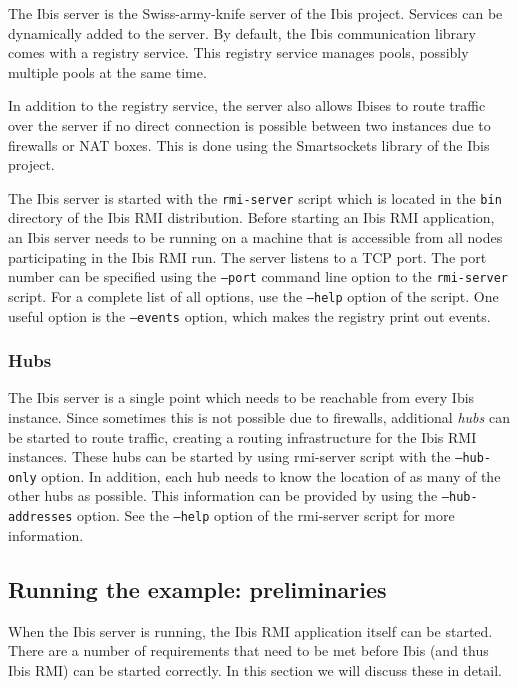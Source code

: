 \documentclass[a4paper,10pt]{article}
\begin{document}
The Ibis server is the Swiss-army-knife server of the Ibis project.
Services can be dynamically added to the server. By default, the Ibis
communication library comes with a registry service. This registry
service manages pools, possibly multiple pools at the same time.

In addition to the registry service, the server also allows
Ibises to route traffic over the server if no direct connection is
possible between two instances due to firewalls or NAT boxes. This is
done using the Smartsockets library of the Ibis project.

The Ibis server is started with the \texttt{rmi-server} script which is
located in the \texttt{bin} directory of the Ibis RMI distribution.  Before
starting an Ibis RMI application, an Ibis server needs to be running on a
machine that is accessible from all nodes participating in the Ibis RMI run.
The server listens to a TCP port. The port number can be specified using
the \texttt{--port} command line option to the \texttt{rmi-server}
script.  For a complete list of all options, use the \texttt{--help}
option of the script. One useful option is the  \texttt{--events}
option, which makes the registry print out events.

\subsubsection{Hubs}
\label{hubs}

The Ibis server is a single point which needs to be reachable from every
Ibis instance. Since sometimes this is not possible due to firewalls,
additional \emph{hubs} can be started to route traffic, creating a
routing infrastructure for the Ibis RMI instances. These hubs can be started
by using rmi-server script with the \texttt{--hub-only} option. In
addition, each hub needs to know the location of as many of the other
hubs as possible. This information can be provided by using the
\texttt{--hub-addresses} option. See the \texttt{--help} option of the
rmi-server script for more information.

\subsection{Running the example: preliminaries}

When the Ibis server is running, the Ibis RMI application itself can be
started.  There are a number of requirements that need to be met before
Ibis (and thus Ibis RMI) can be started correctly.
In this section we will discuss these in detail.
\end{document}

